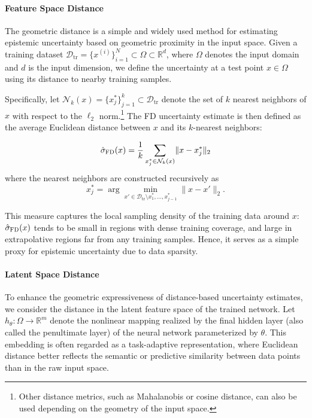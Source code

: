 \documentclass[preprint,12pt]{elsarticle}
\begin{document}
\paragraph{Feature Space Distance}

The geometric distance is a simple and widely used method for estimating epistemic uncertainty based on geometric proximity in the input space. Given a training dataset $\mathcal D_{\mathrm{tr}} = \{x^{(i)}\}_{i=1}^{N} \subset \Omega \subset \mathbb{R}^{d}$, where $\Omega$ denotes the input domain and $d$ is the input dimension, we define the uncertainty at a test point $x \in \Omega$ using its distance to nearby training samples.

Specifically, let $\mathcal{N}_k(x) = \{x_j^\ast\}_{j=1}^k \subset \mathcal D_{\mathrm{tr}}$ denote the set of $k$ nearest neighbors of $x$ with respect to the $\ell_2$ norm.\footnote{Other distance metrics, such as Mahalanobis or cosine distance, can also be used depending on the geometry of the input space.} The FD uncertainty estimate is then defined as the average Euclidean distance between $x$ and its $k$-nearest neighbors:

\begin{equation}
\hat\sigma_{\textsc{FD}}(x)
= \frac{1}{k} \sum_{x_j^\ast \in \mathcal N_k(x)} \lVert x - x_j^\ast \rVert_2
\label{eq:fd_hu}
\end{equation}
where the nearest neighbors are constructed recursively as
\begin{equation}
x_j^\ast = \arg\min_{x' \in \mathcal D_{\mathrm{tr}} \setminus {x_1^\ast, \dots, x_{j-1}^\ast}} \lVert x - x' \rVert_2.
\end{equation}

This measure captures the local sampling density of the training data around $x$: $\hat\sigma_{\textsc{FD}}(x)$ tends to be small in regions with dense training coverage, and large in extrapolative regions far from any training samples. Hence, it serves as a simple proxy for epistemic uncertainty due to data sparsity.

\paragraph{Latent Space Distance}

To enhance the geometric expressiveness of distance-based uncertainty estimates, we consider the distance in the latent feature space of the trained network. Let $h_{\theta} \colon \Omega \to \mathbb{R}^{m}$ denote the nonlinear mapping realized by the final hidden layer (also called the penultimate layer) of the neural network parameterized by $\theta$. This embedding is often regarded as a task-adaptive representation, where Euclidean distance better reflects the semantic or predictive similarity between data points than in the raw input space.
\end{document}
